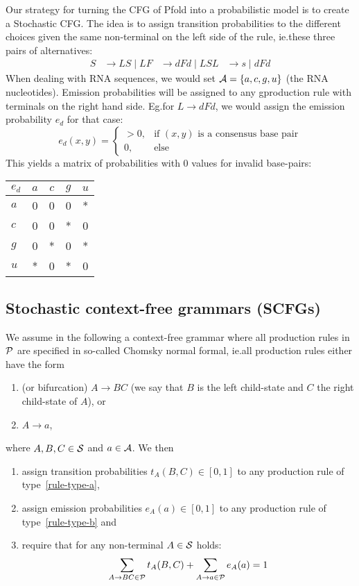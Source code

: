 Our strategy for turning the CFG of Pfold into a probabilistic model is to
create a Stochastic CFG.  The idea is to assign transition probabilities to
the different choices given the same non-terminal on the left side of the rule,
ie.\@ these three pairs of alternatives:
\setcounter{equation}{0}
\begin{align}
  S &\to LS \mid L
  F &\to dFd \mid LS
  L &\to s \mid dFd
\end{align}
When dealing with RNA sequences, we would set \(\mathcal{A}=\{a,c,g,u\}\)
(the RNA nucleotides).  Emission probabilities will be assigned to any
gproduction rule with terminals on the right hand side.  Eg.\@ for \(L\to dFd\),
we would assign the emission probability \(e_d\) for that case:
\[
  e_d(x,y) = \begin{cases}
      >0, &\text{if \((x,y)\) is a consensus base pair} \\
      0, &\text{else}
  \end{cases}
\]
This yields a matrix of probabilities with \(0\) values for invalid base-pairs:
\begin{table}[H]
\centering
\begin{tabular}{l|cccc}
    $e_d$ & $a$ & $c$ & $g$ & $u$ \\
    \hline 
    $a$   & 0   & 0   & 0   & *   \\
    $c$   & 0   & 0   & *   & 0   \\
    $g$   & 0   & *   & 0   & *   \\
    $u$   & *   & 0   & *   & 0
\end{tabular}
\end{table}

\subsection{Stochastic context-free grammars (SCFGs)}

We assume in the following a context-free grammar where all production rules in
\(\mathcal{P}\) are specified in so-called Chomsky normal formal, ie.\@ all
production rules either have the form
\begin{enumerate}[label=(\alph*)]
\item\label{rule-type-a} (or bifurcation) \(A\to BC\) (we say that \(B\) is the
  left child-state and \(C\) the right child-state of \(A\)), or
\item\label{rule-type-b} \(A\to a\),
\end{enumerate}
where \(A,B,C\in\mathcal{S}\) and \(a\in\mathcal{A}\).  We then
\begin{enumerate}[label=\arabic*.]
\item assign transition probabilities \(t_A(B,C)\in[0,1]\) to any production
  rule of type~\ref{rule-type-a},
\item assign emission probabilities \(e_A(a)\in[0,1]\) to any production rule of
  type~\ref{rule-type-b} and
\item require that for any non-terminal \(A\in\mathcal{S}\) holds:
  \[
    \sum_{A\to BC\in\mathcal{P}} t_A(B,C) + \sum_{A\to a\in\mathcal{P}} e_A(a) = 1
  \]
\end{enumerate}

